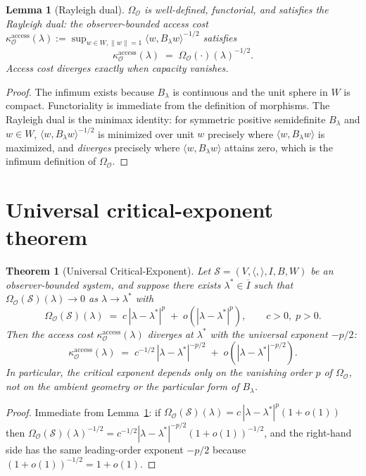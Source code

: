 \documentclass[11pt]{article}
\newtheorem{theorem}{Theorem}
\newtheorem{lemma}{Lemma}
\newcommand{\Obs}{\mathcal{O}}
\newcommand{\OmegaO}{\Omega_{\Obs}}
\newcommand{\kappaO}{\kappa_{\Obs}}
\begin{document}
\begin{lemma}[Rayleigh dual]
\label{lem:rayleigh}
$\OmegaO$ is well-defined, functorial, and satisfies the
\emph{Rayleigh dual}: the observer-bounded access cost
$\kappaO^{\mathrm{access}}(\lambda) :=
\sup_{w \in W, \|w\|=1} \langle w, B_\lambda w\rangle^{-1/2}$
satisfies
\[
\kappaO^{\mathrm{access}}(\lambda) \;=\; \OmegaO(\cdot)(\lambda)^{-1/2}.
\]
Access cost diverges exactly when capacity vanishes.
\end{lemma}

\begin{proof}
The infimum exists because $B_\lambda$ is continuous and the unit
sphere in $W$ is compact. Functoriality is immediate from the
definition of morphisms. The Rayleigh dual is the minimax
identity: for symmetric positive semidefinite $B_\lambda$ and
$w \in W$, $\langle w, B_\lambda w\rangle^{-1/2}$ is minimized
over unit $w$ precisely where $\langle w, B_\lambda w\rangle$ is
maximized, and \emph{diverges} precisely where
$\langle w, B_\lambda w\rangle$ attains zero, which is the
infimum definition of $\OmegaO$.
\end{proof}

\section{Universal critical-exponent theorem}
\label{sec:universal}

\begin{theorem}[Universal Critical-Exponent]
\label{thm:universal}
Let $\mathcal{S} = (V, \langle,\rangle, I, B, W)$ be an
observer-bounded system, and suppose there exists
$\lambda^* \in \overline{I}$ such that
$\OmegaO(\mathcal{S})(\lambda) \to 0$ as $\lambda \to \lambda^*$
with
\[
\OmegaO(\mathcal{S})(\lambda) \;=\; c\,|\lambda - \lambda^*|^p \;+\;
o\!\left(|\lambda - \lambda^*|^p\right),
\qquad c > 0,\; p > 0.
\]
Then the access cost $\kappaO^{\mathrm{access}}(\lambda)$ diverges
at $\lambda^*$ with the \emph{universal exponent} $-p/2$:
\[
\kappaO^{\mathrm{access}}(\lambda) \;=\; c^{-1/2}\,
|\lambda - \lambda^*|^{-p/2} \;+\;
o\!\left(|\lambda - \lambda^*|^{-p/2}\right).
\]
In particular, the critical exponent depends only on the
vanishing order $p$ of $\OmegaO$, not on the ambient geometry or
the particular form of $B_\lambda$.
\end{theorem}

\begin{proof}
Immediate from Lemma~\ref{lem:rayleigh}: if
$\OmegaO(\mathcal{S})(\lambda) = c\,|\lambda - \lambda^*|^p (1 + o(1))$
then
$\OmegaO(\mathcal{S})(\lambda)^{-1/2} =
c^{-1/2} |\lambda - \lambda^*|^{-p/2}(1 + o(1))^{-1/2}$,
and the right-hand side has the same leading-order exponent
$-p/2$ because $(1 + o(1))^{-1/2} = 1 + o(1)$.
\end{proof}
\end{document}
